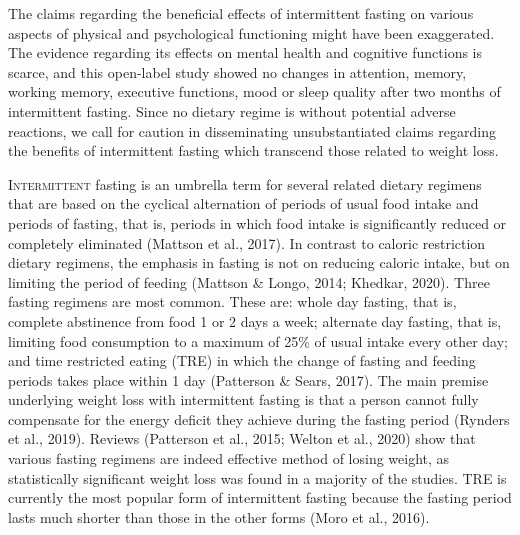 \documentclass[authordate, empirical]{jote-new-article}
\author[1]{\mbox{Ivana Hromatko\orcid{0000-0002-3837-1929}}}
\affil[1]{University of Zagreb, Faculty of Humanities and Social Sciences, Dept. of Psychology}
\author[2]{\mbox{Maja Batorek\orcid{0000-0002-2807-4226}}}
\affil[2]{University of Zagreb}
\begin{document}
\begin{frontmatter}
  \maketitle
  \begin{abstract}
    \printabstracttext
  \end{abstract}
\end{frontmatter}









\begin{takeHomeMessage}


  The claims regarding the beneficial effects of intermittent fasting on various aspects of physical and psychological functioning might have been exaggerated. The evidence regarding its effects on mental health and cognitive functions is scarce, and this open-label study showed no changes in attention, memory, working memory, executive functions, mood or sleep quality after two months of intermittent fasting. Since no dietary regime is without potential adverse reactions, we call for caution in disseminating unsubstantiated claims regarding the benefits of intermittent fasting which transcend those related to weight loss.
\end{takeHomeMessage}






\lettrine{I}{ntermittent} fasting is an umbrella term for several related dietary regimens that are based on the cyclical alternation of periods of usual food intake and periods of fasting, that is, periods in which food intake is significantly reduced or completely eliminated (Mattson et al., 2017). In contrast to caloric restriction dietary regimens, the emphasis in fasting is not on reducing caloric intake, but on limiting the period of feeding (Mattson \& Longo, 2014; Khedkar, 2020). Three fasting regimens are most common. These are: whole day fasting, that is, complete abstinence from food 1 or 2 days a week; alternate day fasting, that is, limiting food consumption to a maximum of 25\% of usual intake every other day; and time restricted eating (TRE) in which the change of fasting and feeding periods takes place within 1 day (Patterson \& Sears, 2017). The main premise underlying weight loss with intermittent fasting is that a person cannot fully compensate for the energy deficit they achieve during the fasting period (Rynders et al., 2019). Reviews (Patterson et al., 2015; Welton et al., 2020) show that various fasting regimens are indeed effective method of losing weight, as statistically significant weight loss was found in a majority of the studies. TRE is currently the most popular form of intermittent fasting because the fasting period lasts much shorter than those in the other forms (Moro et al., 2016).
\end{document}

